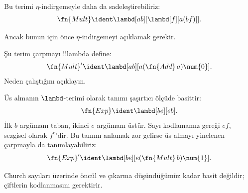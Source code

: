 \documentclass[../../../include/open-logic-section]{subfiles}
\begin{document}
\begin{editorial}
Bu terimi $\eta$-indirgemeyle daha da sadeleştirebiliriz:
\[
  \fn{Mult} \ident \lambd[ab][\lambd[f][a (b f)]].
\]

Ancak bunun için önce $\eta$-indirgemeyi açıklamak gerekir.
\end{editorial}

\begin{prob}
Şu terim çarpmayı !!{lambda define}:
\[
  \fn{Mult}' \ident \lambd[ab][a (\fn{Add}\, a) \num{0}].
\]
Neden çalıştığını açıklayın.
\end{prob}

Üs almanın $\lambd$-terimi olarak tanımı şaşırtıcı ölçüde basittir:
\[
  \fn{Exp} \ident \lambd[be][e b].
\]
İlk $b$ argümanı taban, ikinci $e$ argümanı üstür. Sayı kodlamamız gereği
$ef$, sezgisel olarak $f^e$'dir. Bu tanımı anlamak zor gelirse üs almayı
yinelenen çarpmayla da tanımlayabiliriz:
\[
  \fn{Exp}' \ident \lambd[be][e (\fn{Mult}\, b) \num{1}].
\]

Church sayıları üzerinde öncül ve çıkarma düşündüğümüz kadar basit değildir;
çiftlerin kodlanmasını gerektirir.
\end{document}
